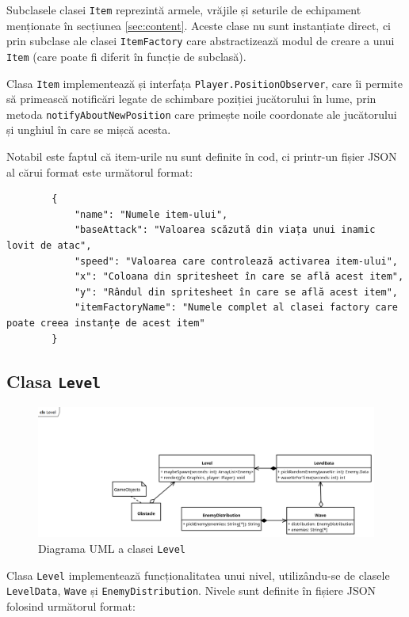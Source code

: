 \documentclass{article}
\begin{document}
    Subclasele clasei \texttt{Item} reprezintă armele, vrăjile și seturile de echipament menționate
    în secțiunea \ref{sec:content}. Aceste clase nu sunt instanțiate direct, ci prin subclase ale
    clasei \texttt{ItemFactory} care abstractizează modul de creare a unui \texttt{Item} (care
    poate fi diferit în funcție de subclasă).

    Clasa \texttt{Item} implementează și interfața \texttt{Player.PositionObserver}, care îi permite
    să primească notificări legate de schimbare poziției jucătorului în lume, prin metoda
    \texttt{notifyAboutNewPosition} care primește noile coordonate ale jucătorului și unghiul în
    care se mișcă acesta.

    Notabil este faptul că item-urile nu sunt definite în cod, ci printr-un fișier JSON al cărui
    format este următorul format:

    \label{sec:item-json}
    \begin{verbatim}
        {
            "name": "Numele item-ului",
            "baseAttack": "Valoarea scăzută din viața unui inamic lovit de atac",
            "speed": "Valoarea care controlează activarea item-ului",
            "x": "Coloana din spritesheet în care se află acest item",
            "y": "Rândul din spritesheet în care se află acest item",
            "itemFactoryName": "Numele complet al clasei factory care poate creea instanțe de acest item"
        }
    \end{verbatim}

    \subsection{Clasa \texttt{Level}}
    \begin{figure}[H]
        \includegraphics[width=\textwidth]{level-diagram}
        \centering
        \caption{Diagrama UML a clasei \texttt{Level}}
    \end{figure}

    Clasa \texttt{Level} implementează funcționalitatea unui nivel, utilizându-se de clasele
    \texttt{LevelData}, \texttt{Wave} și \texttt{EnemyDistribution}. Nivele sunt definite în fișiere
    JSON folosind următorul format:
\end{document}
